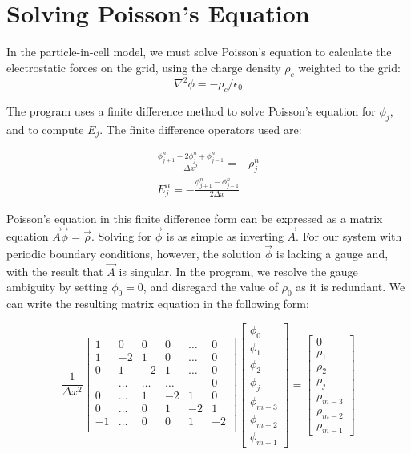 \documentclass[%
 reprint,
 amsmath,amssymb,
 aps,
]{revtex4-2}
\begin{document}
\section{Solving Poisson's Equation}

In the particle-in-cell model, we must solve Poisson's equation to calculate the electrostatic forces on the grid, using the charge density $\rho_c$ weighted to the grid:
\begin{equation}
\nabla ^2 \phi = - \rho_c / \epsilon_0
\end{equation}

The program uses a finite difference method to solve Poisson's equation for $\phi_j$, and to compute $E_j$. The finite difference operators used are:

\begin{eqnarray}
\frac{\phi^n _{j+1} - 2 \phi_j ^n + \phi^n_{j-1}}{\Delta x ^2} = - \rho _j ^n \\
E_j ^n = - \frac{\phi ^n _{j+1} - \phi ^n _{j-1}}{2 \Delta x}
\end{eqnarray}

Poisson's equation in this finite difference form can be expressed as a matrix equation $\vec A \vec \phi = \vec \rho $. Solving for $\vec \phi$ is as simple as inverting $\vec A$. For our system with periodic boundary conditions, however, the solution $\vec \phi$ is lacking a gauge and, with the result that $\vec A$ is singular. In the program, we resolve the gauge ambiguity by setting $\phi_0 = 0$, and disregard the value of $\rho_0$ as it is redundant. We can write the resulting matrix equation in the following form:

\begin{equation}
\frac{1}{\Delta x ^2}\begin{bmatrix}
1 & 0 & 0 & 0 & \ldots & 0 \\
1 & -2 & 1 & 0 & \ldots & 0 \\
0 & 1 & -2 & 1 & \ldots & 0 \\
 & \ldots & \ldots & \ldots &  & 0 \\
0 & \ldots & 1 & -2 & 1 & 0 \\
0 & \ldots & 0 & 1 & -2 & 1 \\
-1 & \ldots & 0 & 0 & 1 & -2 \\
\end{bmatrix} \begin{bmatrix}
\phi_0 \\ \phi_1 \\ \phi_2 \\ \phi_j \\ \phi_{m-3} \\ \phi_{m-2} \\ \phi_{m-1} 
\end{bmatrix} = \begin{bmatrix}
0 \\ \rho_1 \\ \rho_2 \\ \rho_j \\ \rho_{m-3} \\ \rho_{m-2} \\ \rho_{m-1} 
\end{bmatrix}
\end{equation}
\end{document}

